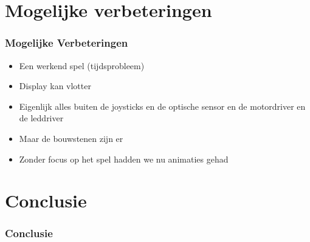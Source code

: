 \documentclass{beamer}
\begin{document}
\section{Mogelijke verbeteringen}
\begin{frame}
  \frametitle{Mogelijke Verbeteringen}

  \begin{itemize}
    \pause
  \item Een werkend spel (tijdsprobleem)
  \item Display kan vlotter
    \pause
  \item Eigenlijk alles buiten de joysticks en de optische sensor en de
    motordriver en de leddriver
    \pause
  \item Maar de bouwstenen zijn er
  \item Zonder focus op het spel hadden we nu animaties gehad
  \end{itemize}

\end{frame}

\section{Conclusie}
\begin{frame}
  \frametitle{Conclusie}

\end{frame}
\end{document}
